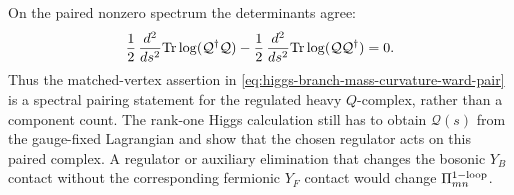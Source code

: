 \begin{example}
On the paired nonzero spectrum the determinants agree:
\begin{equation}
  \frac12\,\frac{d^2}{ds^2}{\rm Tr}\log
  ({\mathcal Q}^\dagger{\mathcal Q})
  -
  \frac12\,\frac{d^2}{ds^2}{\rm Tr}\log
  ({\mathcal Q}{\mathcal Q}^\dagger)
  =
  0 .
  \label{eq:higgs-branch-supercharge-factorized-supertrace}
\end{equation}
Thus the matched-vertex assertion in
\eqref{eq:higgs-branch-mass-curvature-ward-pair} is a spectral pairing
statement for the regulated heavy \(Q\)-complex, rather than a component count.
The rank-one Higgs calculation still has to obtain \({\mathcal Q}(s)\) from the
gauge-fixed Lagrangian and show that the chosen regulator acts on this paired
complex.  A regulator or auxiliary elimination that changes the bosonic
\(Y_B\) contact without the corresponding fermionic \(Y_F\) contact would change
\(\Pi_{mn}^{\rm 1-loop}\).
\end{example}

